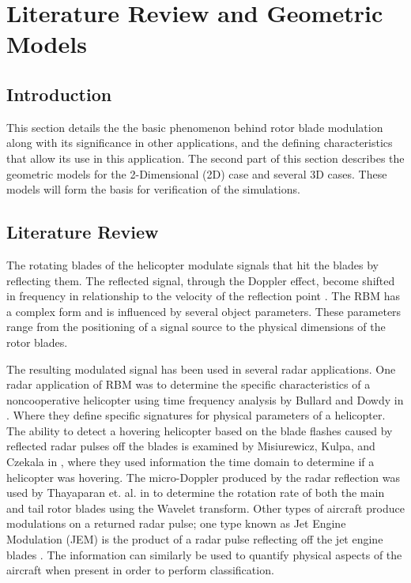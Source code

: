 \chapter{Literature Review and Geometric Models} \label{ch:background}

\section{Introduction}
This section details the the basic phenomenon behind rotor blade modulation along with its significance in other applications, and the defining characteristics that allow its use in this application. The second part of this section describes the geometric models for the 2-Dimensional (2D) case and several 3D cases. These models will form the basis for verification of the simulations.

\section{Literature Review}
The rotating blades of the helicopter modulate signals that hit the blades by reflecting them. The reflected signal, through the Doppler effect, become shifted in frequency in relationship to the velocity of the reflection point \cite{YiminZhang2000}. The RBM has a complex form and is influenced by several object parameters. These parameters range from the positioning of a signal source to the physical dimensions of the rotor blades. 

The resulting modulated signal has been used in several radar applications. One radar application of RBM was to determine the specific characteristics of a noncooperative helicopter using time frequency analysis by Bullard and Dowdy in \cite{Bullard1991}. Where they define specific signatures for physical parameters of a helicopter. The ability to detect a hovering helicopter based on the blade flashes caused by reflected radar pulses off the blades is examined by Misiurewicz, Kulpa, and Czekala in \cite{Misiurewicz1997}, where they used information the time domain to determine if a helicopter was hovering. The micro-Doppler produced by the radar reflection was used by Thayaparan et. al. in \cite{Thayaparan2007} to determine the rotation rate of both the main and tail rotor blades using the Wavelet transform. Other types of aircraft produce modulations on a returned radar pulse; one type known as Jet Engine Modulation (JEM) is the product of a radar pulse reflecting off the jet engine blades \cite{NavalAirSystemsCommand1999}. The information can similarly be used to quantify physical aspects of the aircraft when present in order to perform classification.

